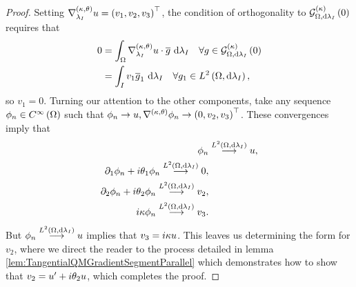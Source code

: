 \begin{proof}
	Setting $\nabla^{\left( \kappa, \theta \right)}_{\lambda_I}u = \left( v_1,v_2,v_3 \right)^{\top}$, the condition of orthogonality to $\mathcal{G}_{ \Omega, \mathrm{d}\lambda_I}^{(\kappa)}\left( 0 \right)$ requires that
	\begin{align*}
		0 &= \int_{\Omega}\nabla^{\left( \kappa, \theta \right)}_{\lambda_I}u \cdot \overline{g} \ \mathrm{d}\lambda_I \quad \forall g\in\mathcal{G}_{ \Omega, \mathrm{d}\lambda_I}^{(\kappa)}\left( 0 \right) \\
		&= \int_{I}v_1 \overline{g}_1 \ \mathrm{d}\lambda_{I} \quad \forall g_1\in L^{2}\left( \Omega,\mathrm{d}\lambda_I \right),
	\end{align*}
	so $v_1=0$.
	Turning our attention to the other components, take any sequence $\phi_n\in C^{\infty}\left( \Omega \right)$ such that $\phi_n\rightarrow u, \nabla^{\left( \kappa, \theta \right)}\phi_n\rightarrow \left( 0,v_2,v_3 \right)^\top$.
	These convergences imply that
	\begin{align*}
		\phi_n &\overset{L^{2}\left( \Omega,\mathrm{d}\lambda_I \right)}{\longrightarrow} u, \\
		\partial_1\phi_n + i\theta_1 \phi_n \overset{L^{2}\left( \Omega,\mathrm{d}\lambda_I \right)}{\longrightarrow} 0, \\
		\partial_2\phi_n + i\theta_2 \phi_n \overset{L^{2}\left( \Omega,\mathrm{d}\lambda_I \right)}{\longrightarrow} v_2, \\
		i\kappa\phi_n \overset{L^{2}\left( \Omega,\mathrm{d}\lambda_I \right)}{\longrightarrow} v_3.
	\end{align*}
	But $\phi_n \overset{L^{2}\left( \Omega,\mathrm{d}\lambda_I \right)}{\longrightarrow} u$ implies that $v_3 = i\kappa u$.
	This leaves us determining the form for $v_2$, where we direct the reader to the process detailed in lemma \ref{lem:TangentialQMGradientSegmentParallel} which demonstrates how to show that $v_2 = u' + i\theta_2 u$, which completes the proof.
\end{proof}

